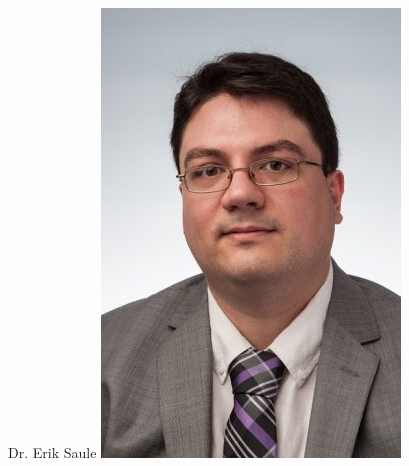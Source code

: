 \documentclass[aspectratio=169]{beamer}
\begin{document}
\begin{frame}
\begin{columns}
    Dr. Erik Saule
    \includegraphics[width=.9\linewidth]{pics/Saule.jpg}
    

\end{columns}
\end{frame}
\end{document}

